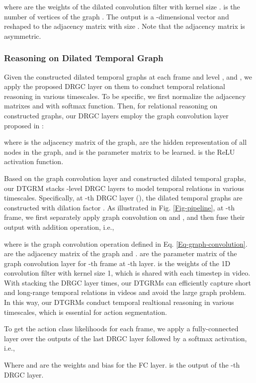 \documentclass[letterpaper]{article} \usepackage{aaai21}  \usepackage{times}  \usepackage{helvet} \usepackage{courier}  \usepackage[hyphens]{url}  \usepackage{graphicx} \usepackage{mathtools}
\begin{document}
where  are the weights of the dilated convolution filter with kernel size .  is the number of vertices of the graph . The output  is a -dimensional vector and reshaped to the adjacency matrix with size . Note that the adjacency matrix  is asymmetric.

\subsubsection{Reasoning on Dilated Temporal Graph}
Given the constructed dilated temporal graphs at each frame  and level ,  and , we apply the proposed DRGC layer on them to conduct temporal relational reasoning in various timescales. To be specific, we first normalize the adjacency matrixes  and  with softmax function. Then, for relational reasoning on constructed graphs, our DRGC layers employ the graph convolution layer proposed in \cite{kipf2016semi}:

where  is the adjacency matrix of the graph,  are the hidden representation of all nodes in the graph, and  is the parameter matrix to be learned.  is the ReLU activation function.

Based on the graph convolution layer and constructed dilated temporal graphs, our DTGRM stacks -level DRGC layers to model temporal relations in various timescales. Specifically, at -th DRGC layer (), the dilated temporal graphs are constructed with dilation factor . As illustrated in Fig. \ref{Fig-pipeline}, at -th frame, we first separately apply graph convolution on  and , and then fuse their output with addition operation, i.e.,

where  is the graph convolution operation defined in Eq. \ref{Eq-graph-convolution}.  are the adjacency matrix of the graph  and .  are the parameter matrix of the graph convolution layer for -th frame at -th layer.  is the weights of the 1D convolution filter with kernel size 1, which is shared with each timestep in video. With stacking the DRGC layer  times, our DTGRMs can efficiently capture short and long-range temporal relations in videos and avoid the large graph problem. In this way, our DTGRMs conduct temporal realtional reasoning in various timescales, which is essential for action segmentation.

To get the action class likelihoods  for each frame, we apply a fully-connected layer over the outputs of the last DRGC layer followed by a softmax activation, i.e.,

Where  and  are the weights and bias for the FC layer.  is the output of the -th DRGC layer.
\end{document}
